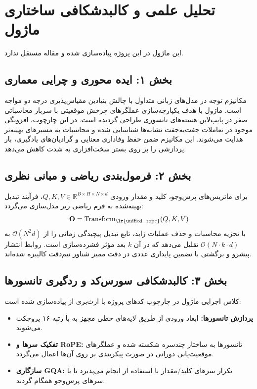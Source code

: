\section{تحلیل علمی و کالبدشکافی ساختاری ماژول }

این ماژول در این پروژه پیاده‌سازی شده و مقاله مستقل ندارد.
\label{sec:unified_rope}

\subsection*{بخش ۱: ایده محوری و چرایی معماری }
مکانیزم توجه در مدل‌های زبانی متداول با چالش بنیادین مقیاس‌پذیری درجه دو مواجه است. ماژول  با هدف یکپارچه‌سازی عملگرهای چرخش موقعیتی با سربار محاسباتی صفر در پایپ‌لاین هسته‌های تانسوری طراحی گردیده است. در این چارچوب، افزونگی موجود در تعاملات جفت‌به‌جفت نشانه‌ها شناسایی شده و محاسبات به مسیرهای بهینه‌تر هدایت می‌شوند. این مکانیزم ضمن حفظ وفاداری معنایی و گرادیان‌های یادگیری، بار پردازشی را بر روی بستر سخت‌افزاری به شدت کاهش می‌دهد.

\subsection*{بخش ۲: فرمول‌بندی ریاضی و مبانی نظری }
برای ماتریس‌های پرس‌وجو، کلید و مقدار ورودی $Q, K, V \in \mathbb{R}^{B \times H \times N \times d}$، فرآیند تبدیل بهینه‌شده به فرم ریاضی زیر مدل‌سازی می‌گردد:
\begin{equation}
\mathbf{O} = \operatorname{Transform}_{\text{\lr{unified\_rope}}}(Q, K, V)
\end{equation}
با تجزیه محاسبات و حذف عملیات زاید، تابع تبدیل پیچیدگی زمانی را از $\mathcal{O}(N^2 d)$ به $\mathcal{O}(N \cdot k \cdot d)$ تقلیل می‌دهد که در آن $k$ بعد مؤثر فشرده‌سازی است. روابط انتشار پیشرو و برگشتی با تضمین پایداری عددی در دقت ممیز شناور نیم‌دقت  کالیبره شده‌اند.

\subsection*{بخش ۳: کالبدشکافی سورس‌کد و ردگیری تانسورها }
کلاس اجرایی ماژول در چارچوب کدهای پروژه با ارث‌بری از  پیاده‌سازی شده است:
\begin{itemize}
    \item \textbf{پردازش تانسورها:} ابعاد ورودی \lr{$[B, N, D]$} از طریق لایه‌های خطی مجهز به  با رتبه ۱۶ پروجکت می‌شوند.
    \item \textbf{تفکیک سرها و RoPE:} تانسورها به ساختار چندسره \lr{$[B, H, N, d]$} شکسته شده و عملگرهای موقعیت‌یابی دورانی در صورت پیکربندی بر روی آن‌ها اعمال می‌گردد.
    \item \textbf{سازگاری GQA:} تکرار سرهای کلید/مقدار با استفاده از  انجام می‌پذیرد تا با سرهای پرس‌وجو همگام گردند.
\end{itemize}

